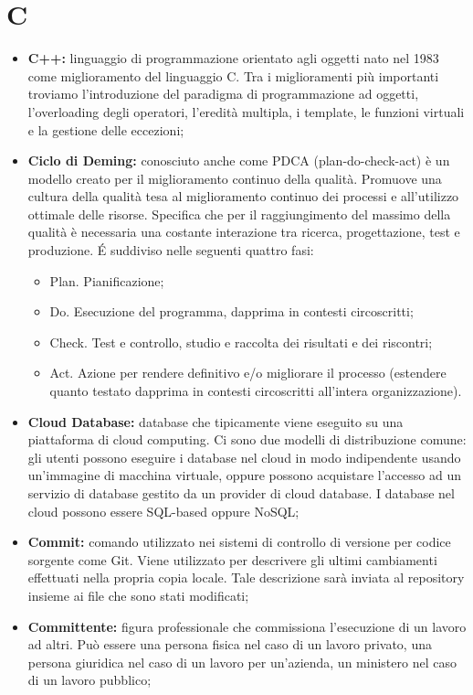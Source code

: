 \section*{\Huge C} %
\label{sec:c}
	\begin{itemize}
		\item \textbf{C++:} linguaggio di programmazione orientato agli oggetti nato nel 1983 come miglioramento del linguaggio C. Tra i miglioramenti più importanti troviamo l'introduzione del paradigma di programmazione ad oggetti, l'overloading degli operatori, l'eredità multipla, i template, le funzioni virtuali e la gestione delle eccezioni;
		\item \textbf{Ciclo di Deming:} conosciuto anche come PDCA (plan-do-check-act) è un modello creato per il miglioramento continuo della qualità. Promuove una cultura della qualità tesa al miglioramento continuo dei processi e all'utilizzo ottimale delle risorse. Specifica che per il raggiungimento del massimo della qualità è necessaria una costante interazione tra ricerca, progettazione, test e produzione. É suddiviso nelle seguenti quattro fasi:
			\begin{itemize}
				\item Plan. Pianificazione;
				\item Do. Esecuzione del programma, dapprima in contesti circoscritti;
				\item Check. Test e controllo, studio e raccolta dei risultati e dei riscontri;
				\item Act. Azione per rendere definitivo e/o migliorare il processo (estendere quanto testato dapprima in contesti circoscritti all'intera organizzazione).
			\end{itemize}
		\item \textbf{Cloud Database:} database che tipicamente viene eseguito su una piattaforma di cloud computing. Ci sono due modelli di distribuzione comune: gli utenti possono eseguire i database nel cloud in modo indipendente usando un'immagine di macchina virtuale, oppure possono acquistare l'accesso ad un servizio di database gestito da un provider di cloud database. I database nel cloud possono essere SQL-based oppure NoSQL;
		\item \textbf{Commit:} comando utilizzato nei sistemi di controllo di versione per codice sorgente come Git. Viene utilizzato per descrivere gli ultimi cambiamenti effettuati nella propria copia locale. Tale descrizione sarà inviata al repository insieme ai file che sono stati modificati;
		\item \textbf{Committente:} figura professionale che commissiona l'esecuzione di un lavoro ad altri. Può essere una persona fisica nel caso di un lavoro privato, una persona giuridica nel caso di un lavoro per un'azienda, un ministero nel caso di un lavoro pubblico;

\end{itemize}
